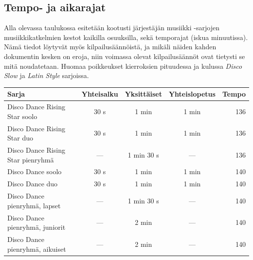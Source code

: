 \documentclass[12pt, a4paper, oneside]{article}
\begin{document}
\subsection{Tempo- ja aikarajat} \label{rajat}

Alla olevassa taulukossa esitetään kootusti järjestäjän musiikki -sarjojen musiikkikatkelmien kestot kaikilla osuuksilla,
sekä temporajat (iskua minuutissa).
Nämä tiedot löytyvät myös kilpailusäännöistä,
ja mikäli näiden kahden dokumentin kesken on eroja,
niin voimassa olevat kilpailusäännöt ovat tietysti se mitä noudatetaan.
Huomaa poikkeukset kierroksien pituudessa ja kulussa \textit{Disco Slow} ja \textit{Latin Style} sarjoissa.
\begin{table}[ht]
    \centering
    \setlength\tabcolsep{9pt}
    \small
    \renewcommand{\arraystretch}{1.5}
    \begin{tabular}{@{\hspace{0.25cm}}lcccr@{\hspace{0.25cm}}}
        \toprule
        \textbf{Sarja}                                  & \textbf{Yhteisalku} & \textbf{Yksittäiset} & \textbf{Yhteislopetus} & \textbf{Tempo} \\ \midrule
        Disco Dance Rising Star soolo                   & 30 s                & 1 min                & 1 min                  & 136            \\
        Disco Dance Rising Star duo                     & 30 s                & 1 min                & 1 min                  & 136            \\
        Disco Dance Rising Star pienryhmä               & ---                 & 1 min 30 s           & ---                    & 136            \\
        Disco Dance soolo                               & 30 s                & 1 min                & 1 min                  & 140            \\
        Disco Dance duo                                 & 30 s                & 1 min                & 1 min                  & 140            \\
        Disco Dance pienryhmä, lapset                   & ---                 & 1 min 30 s           & ---                    & 140            \\
        Disco Dance pienryhmä, juniorit                 & ---                 & 2 min                & ---                    & 140            \\
        Disco Dance pienryhmä, aikuiset                 & ---                 & 2 min                & ---                    & 140            \\

\end{tabular}
\end{table}
\end{document}
